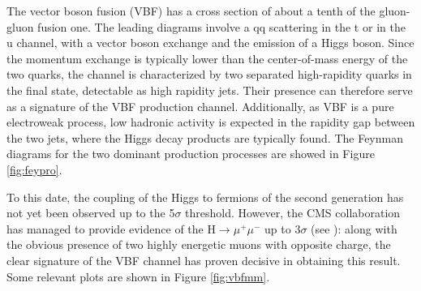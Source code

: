 The vector boson fusion (VBF) has a cross section of about a tenth of the gluon-gluon fusion one. The leading diagrams involve a qq scattering in the t or in the u channel, with a
vector boson exchange and the emission of a Higgs boson. Since the momentum exchange
is typically lower than the center-of-mass energy of the two quarks, the channel is characterized by two separated high-rapidity quarks in the final state, detectable as high rapidity
jets. Their presence can therefore serve as a signature of the VBF production channel. Additionally, as VBF is a pure electroweak process, low hadronic activity is expected in the
rapidity gap between the two jets, where the Higgs decay products are typically found. The Feynman diagrams for the two dominant production processes are showed in Figure \ref{fig:feypro}.

To this date, the coupling of the Higgs to fermions of the second generation has not yet been observed up to the 5$\sigma$ threshold. However, the CMS collaboration has managed to provide evidence of the H$\rightarrow\mu^+\mu^-$ up to 3$\sigma$ (see \cite{Sirunyan_2021}): along with the obvious presence of two highly energetic muons with opposite charge, the clear signature of the VBF channel has proven decisive in obtaining this result. Some relevant plots are shown in Figure \ref{fig:vbfmm}.

